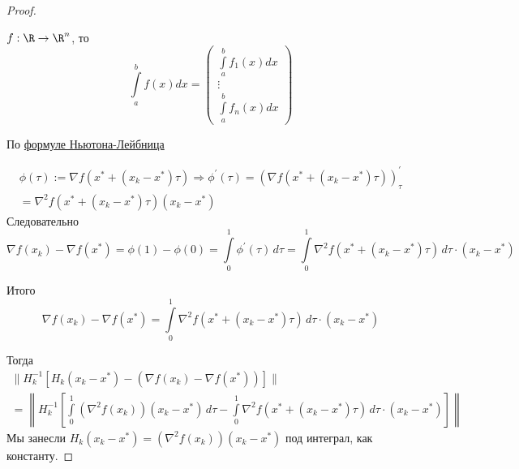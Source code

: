 \begin{proof}
  \begin{remark}
    $f: \R \rightarrow \R^n$, то
    \[
    \int\limits_a^b f(x) dx = \left( \begin{array}{c} \int\limits_a^b f_1(x) dx \\ \vdots \\ \int\limits_a^b f_n(x) dx \end{array} \right)
    \]
  \end{remark}

  По \hyperref[note:AD362344-ECDC-4627-B344-8356744E6E53]{формуле Ньютона-Лейбница}

  \begin{multline*}
  \phi(\tau) := \nabla f(x^{*} + (x_k - x^{*})\tau) \Rightarrow \phi^{\prime}(\tau) = (\nabla f(x^{*} + (x_k - x^{*}) \tau))^{\prime}_{\tau} \\ =  \nabla^2 f(x^{*} + (x_k - x^{*}) \tau) (x_k - x^{*})
  \end{multline*}
  Следовательно
  \[
  \nabla f(x_k) - \nabla f(x^{*}) = \phi(1) - \phi(0) = \int\limits_0^1 \phi^{\prime}(\tau)\, d\tau
  =  \int\limits_0^1 \nabla^2 f(x^{*} + (x_k - x^{*})\tau)\,d \tau \cdot (x_k - x^{*})
  \]

  Итого
  \[
  \nabla f(x_k) - \nabla f(x^{*}) = \int\limits_0^1 \nabla^2 f(x^{*} + (x_k - x^{*})\tau)\,d \tau \cdot (x_k - x^{*})
  \]

  Тогда
  \begin{multline*}
  \|H_k^{-1}[H_k(x_k - x^{*}) - (\nabla f(x_k) - \nabla f(x^{*}))]\| \\
   = \left\|
  H_k^{-1} \left[ \int\limits_0^1 (\nabla^2 f(x_k))(x_k-x^{*})\,d\tau -
  \int\limits_0^1 \nabla^2f (x^{*} + (x_k - x^{*}) \tau )\,d\tau \cdot (x_k - x^{*})  \right]
  \right\|
  \end{multline*}
  Мы занесли $H_k(x_k -x^{*}) =  (\nabla^2 f(x_k)) (x_k - x^{*})$ под интеграл, как константу.


\end{proof}
